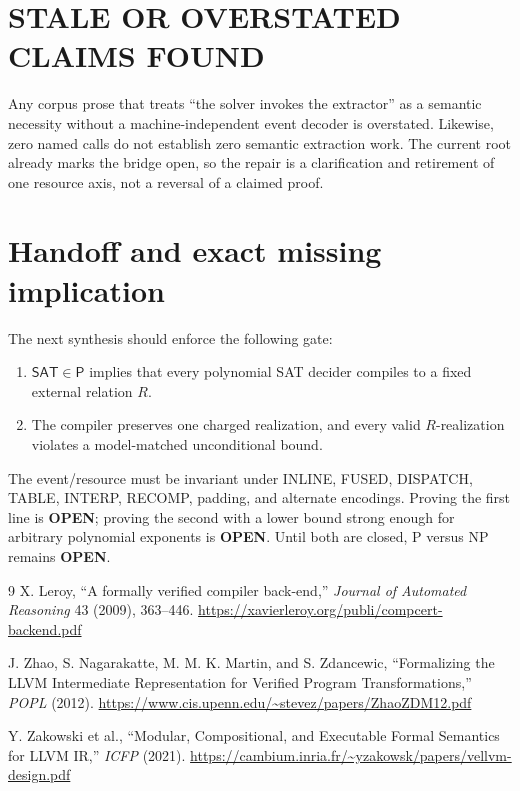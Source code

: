 \documentclass[11pt]{article}
\newcommand{\Open}{\textbf{OPEN}}
\begin{document}
\section{STALE OR OVERSTATED CLAIMS FOUND}
Any corpus prose that treats ``the solver invokes the extractor'' as a semantic
necessity without a machine-independent event decoder is overstated.  Likewise,
zero named calls do not establish zero semantic extraction work.  The current
root already marks the bridge open, so the repair is a clarification and
retirement of one resource axis, not a reversal of a claimed proof.

\section{Handoff and exact missing implication}
The next synthesis should enforce the following gate:
\begin{enumerate}[leftmargin=1.5em]
\item $\mathsf{SAT}\in\mathsf P$ implies that every polynomial SAT decider
compiles to a fixed external relation $R$.
\item The compiler preserves one charged realization, and every valid
$R$-realization violates a model-matched unconditional bound.
\end{enumerate}
The event/resource must be invariant under INLINE, FUSED, DISPATCH, TABLE,
INTERP, RECOMP, padding, and alternate encodings.  Proving the first line is
\Open; proving the second with a lower bound strong enough for arbitrary
polynomial exponents is \Open.  Until both are closed, P versus NP remains
\Open.

\begin{thebibliography}{9}
X. Leroy, ``A formally verified compiler back-end,'' \emph{Journal of Automated
Reasoning} 43 (2009), 363--446.
\url{https://xavierleroy.org/publi/compcert-backend.pdf}

J. Zhao, S. Nagarakatte, M. M. K. Martin, and S. Zdancewic,
``Formalizing the LLVM Intermediate Representation for Verified Program
Transformations,'' \emph{POPL} (2012).
\url{https://www.cis.upenn.edu/~stevez/papers/ZhaoZDM12.pdf}

Y. Zakowski et al., ``Modular, Compositional, and Executable Formal Semantics
for LLVM IR,'' \emph{ICFP} (2021).
\url{https://cambium.inria.fr/~yzakowsk/papers/vellvm-design.pdf}
\end{thebibliography}

\end{document}
